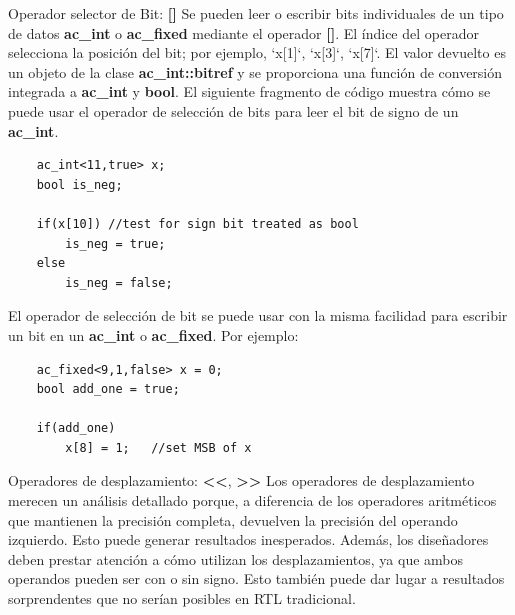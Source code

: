 \documentclass[11pt]{beamer}
\begin{document}
	
	\begin{frame}[fragile]{Operador selector de Bit: \textbf{[]}}
	\justifying \footnotesize
	Se pueden leer o escribir bits individuales de un tipo de datos \textbf{ac\_int} o  \textbf{ac\_fixed} mediante el operador \textbf{[]}. El índice del operador selecciona la posición del bit; por ejemplo, `x[1]`, `x[3]`, `x[7]`. El valor devuelto es un objeto de la clase \textbf{ac\_int::bitref} y se proporciona una función de conversión integrada a \textbf{ac\_int} y \textbf{bool}. El siguiente fragmento de código muestra cómo se puede usar el operador de selección de bits para leer el bit de signo de un \textbf{ac\_int}.	
		
	\begin{lstlisting}
	ac_int<11,true> x;
	bool is_neg;
	
	if(x[10]) //test for sign bit treated as bool
		is_neg = true;
	else
		is_neg = false;
	\end{lstlisting}
	El operador de selección de bit se puede usar con la misma facilidad para escribir un bit en un \textbf{ac\_int} o \textbf{ac\_fixed}. Por ejemplo: 
	\begin{lstlisting}
	ac_fixed<9,1,false> x = 0;
	bool add_one = true;
	
	if(add_one)
		x[8] = 1; 	//set MSB of x
	\end{lstlisting}
	\end{frame}

	\begin{frame}{Operadores de desplazamiento: \textbf{<<}, \textbf{>>}}
	\justifying \footnotesize
	Los operadores de desplazamiento merecen un análisis detallado porque, a diferencia de los operadores aritméticos que mantienen la precisión completa, devuelven la precisión del operando izquierdo. Esto puede generar resultados inesperados. Además, los diseñadores deben prestar atención a cómo utilizan los desplazamientos, ya que ambos operandos pueden ser con o sin signo. Esto también puede dar lugar a resultados sorprendentes que no serían posibles en RTL tradicional.
	\end{frame}
\end{document}
